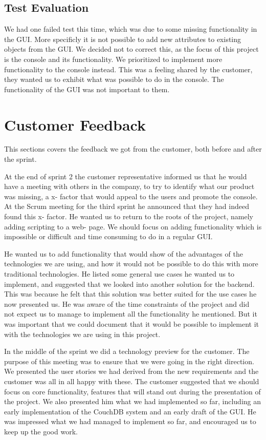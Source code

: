 \subsection{Test Evaluation}
We had one failed test this time, which was due to some missing functionality in the GUI. More specificly it is not possible to add new attributes to existing objects from the GUI. We decided not to correct this, as the focus of this project is the console and its functionality. We prioritized to implement more functionality to the console instead. This was a feeling shared by the customer, they wanted us to exhibit what was possible to do in the console. The functionality of the GUI was not important to them.

\section{Customer Feedback}
This sections covers the feedback we got from the customer, both before and after the sprint.


At the end of sprint 2 the customer representative informed us that he would have a meeting with others in the company, to try to identify what our product was missing, a x- factor that would appeal to the users and promote the console. At the Scrum meeting for the third sprint he announced that they had indeed found this x- factor. He wanted us to return to the roots of the project, namely adding scripting to a web- page. We should focus on adding functionality which is impossible or difficult and time consuming to do in a regular GUI.


He wanted us to add functionality that would show of the advantages of the technologies we are using, and how it would not be possible to do this with more traditional technologies. He listed some general use cases he wanted us to implement, and suggested that we looked into another solution for the backend. This was because he felt that this solution was better suited for the use cases he now presented us. He was aware of the time constraints of the project and did not expect us to manage to implement all the functionality he mentioned. But it was important that we could document that it would be possible to implement it with the technologies we are using in this project.


In the middle of the sprint we did a technology preview for the customer. The purpose of this meeting was to ensure that we were going in the right direction. We presented the user stories we had derived from the new requirements and the customer was all in all happy with these. The customer suggested that we should focus on core functionality, features that will stand out during the presentation of the project. We also presented him what we had implemented so far, including an early implementation of the CouchDB system and an early draft of the GUI. He was impressed what we had managed to implement so far, and encouraged us to keep up the good work.


